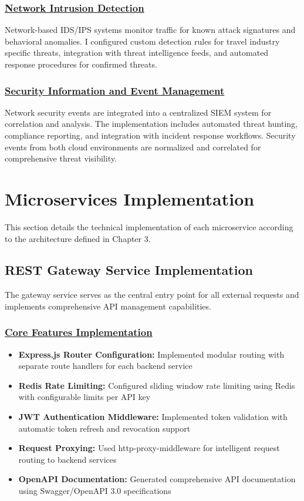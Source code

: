 \subsubsection*{\underline{Network Intrusion Detection}}
Network-based IDS/IPS systems monitor traffic for known attack signatures and behavioral anomalies. I configured custom detection rules for travel industry specific threats, integration with threat intelligence feeds, and automated response procedures for confirmed threats.

\subsubsection*{\underline{Security Information and Event Management}}
Network security events are integrated into a centralized SIEM system for correlation and analysis. The implementation includes automated threat hunting, compliance reporting, and integration with incident response workflows. Security events from both cloud environments are normalized and correlated for comprehensive threat visibility.

\section{Microservices Implementation}
This section details the technical implementation of each microservice according to the architecture defined in Chapter 3.

\subsection{REST Gateway Service Implementation}
The gateway service serves as the central entry point for all external requests and implements comprehensive API management capabilities.

\subsubsection*{\underline{Core Features Implementation}}
\begin{itemize}
    \item \textbf{Express.js Router Configuration:} Implemented modular routing with separate route handlers for each backend service
    \item \textbf{Redis Rate Limiting:} Configured sliding window rate limiting using Redis with configurable limits per API key
    \item \textbf{JWT Authentication Middleware:} Implemented token validation with automatic token refresh and revocation support
    \item \textbf{Request Proxying:} Used http-proxy-middleware for intelligent request routing to backend services
    \item \textbf{OpenAPI Documentation:} Generated comprehensive API documentation using Swagger/OpenAPI 3.0 specifications
\end{itemize}


